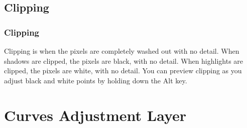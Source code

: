 \documentclass{beamer}
\begin{document}
\subsection{Clipping}		
\begin{frame}
	\frametitle{Clipping}
		\begin{outline}
			\1  Clipping is when the pixels are completely washed out with no detail.
			\2 When shadows are clipped, the pixels are black, with no detail. 
			\2 When highlights are clipped, the pixels are white, with no detail.
			\1 You can preview clipping as you adjust black and white points by holding down the Alt key.
		\end{outline}
\end{frame}

		\section{Curves Adjustment Layer}
\end{document}
